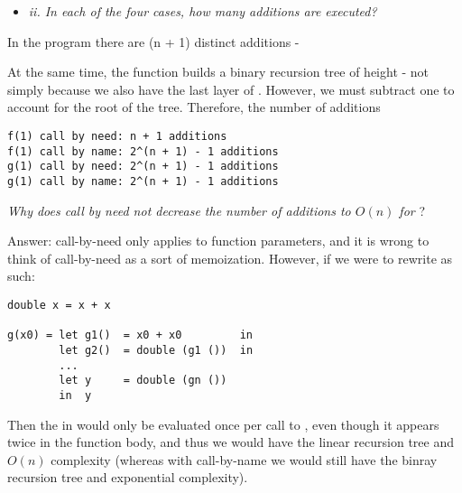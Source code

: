 \begin{itemize}
  \item \textit{ii. In each of the four cases, how many additions are executed?}
\end{itemize}


\medskip

In the program there are {(n + 1)} distinct additions - 

\medskip


At the same time, the function  builds a binary recursion tree of height
 - not simply  because we also have the last layer of . However, we must subtract one to account for the root of the tree.
Therefore, the number of additions

\begin{verbatim}
f(1) call by need: n + 1 additions
f(1) call by name: 2^(n + 1) - 1 additions
g(1) call by need: 2^(n + 1) - 1 additions
g(1) call by name: 2^(n + 1) - 1 additions
\end{verbatim}

\medskip

\noindent \emph{Why does call by need not decrease the number of additions to
$O(n)$ for} ?

\smallskip

Answer: call-by-need only applies to function parameters, and it is wrong to
think of call-by-need as a sort of memoization. However, if we were to rewrite
 as such:

\begin{verbatim}
double x = x + x

g(x0) = let g1()  = x0 + x0         in
        let g2()  = double (g1 ())  in
        ...
        let y     = double (gn ())
        in  y
\end{verbatim}

Then the  in  would only be evaluated once per call to
, even though it appears twice in the function body, and thus we
would have the linear recursion tree and $O(n)$ complexity (whereas with
call-by-name we would still have the binray recursion tree and exponential
complexity).

\Sectend
